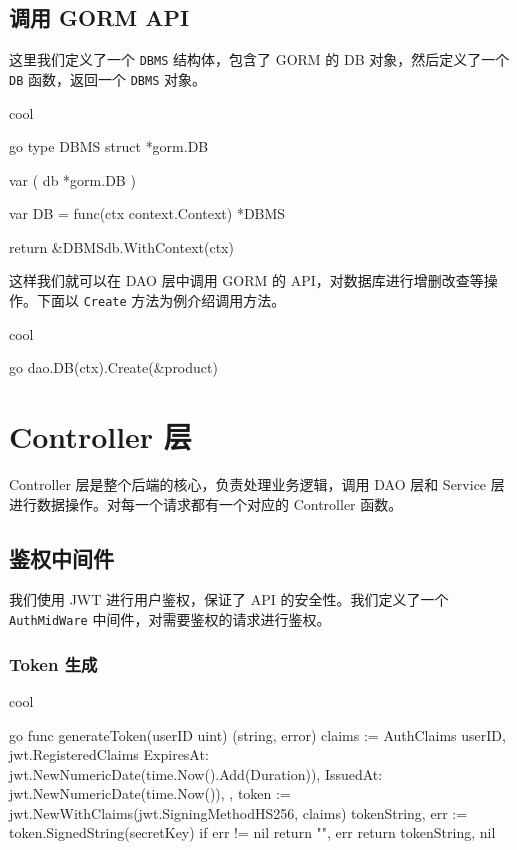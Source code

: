 \subsection{调用 GORM API}

这里我们定义了一个 \texttt{DBMS} 结构体，包含了 GORM 的 DB 对象，然后定义了一个 \texttt{DB} 函数，返回一个 \texttt{DBMS} 对象。

\begin{codebox}{}{cool}
\begin{amzcode}{go}
type DBMS struct {
	*gorm.DB
}

var (
	db *gorm.DB
)

var DB = func(ctx context.Context) *DBMS {
	return &DBMS{db.WithContext(ctx)}

}
\end{amzcode}
\end{codebox}

这样我们就可以在 DAO 层中调用 GORM 的 API，对数据库进行增删改查等操作。下面以 \texttt{Create} 方法为例介绍调用方法。

\begin{codebox}{}{cool}
\begin{amzcode}{go}
dao.DB(ctx).Create(&product)
\end{amzcode}
\end{codebox}

\section{Controller 层}

Controller 层是整个后端的核心，负责处理业务逻辑，调用 DAO 层和 Service 层进行数据操作。对每一个请求都有一个对应的 Controller 函数。

\subsection{鉴权中间件}

我们使用 JWT 进行用户鉴权，保证了 API 的安全性。我们定义了一个 \texttt{AuthMidWare} 中间件，对需要鉴权的请求进行鉴权。

\subsubsection{Token 生成}

\begin{codebox}{}{cool}
\begin{amzcode}{go}
func generateToken(userID uint) (string, error) {
	claims := AuthClaims{
		userID,
		jwt.RegisteredClaims{
			ExpiresAt: jwt.NewNumericDate(time.Now().Add(Duration)),
			IssuedAt:  jwt.NewNumericDate(time.Now()),
		},
	}
	token := jwt.NewWithClaims(jwt.SigningMethodHS256, claims)
	tokenString, err := token.SignedString(secretKey)
	if err != nil {
		return "", err
	}
	return tokenString, nil
}
\end{amzcode}
\end{codebox}

